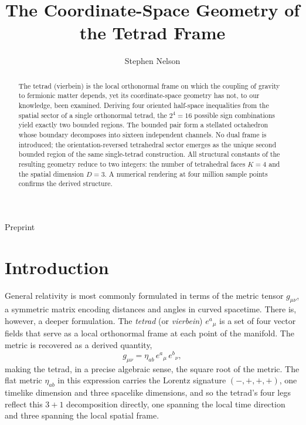 \documentclass[twocolumn]{iopjournal}
\renewcommand{\articletype}[1]{%
  {\vspace*{-8mm}\noindent \Large \sf Preprint}\par
  \vspace*{6mm}\noindent{\scriptsize \sf{\bfseries \MakeUppercase{#1}}}}
\begin{document}
\articletype{Letter}

\title{The Coordinate-Space Geometry of the Tetrad Frame}

\author{Stephen Nelson}



\begin{abstract}
The tetrad (vierbein) is the local orthonormal frame on which the coupling of gravity to fermionic matter depends, yet its coordinate-space geometry has not, to our knowledge, been examined. Deriving four oriented half-space inequalities from the spatial sector of a single orthonormal tetrad, the $2^4 = 16$ possible sign combinations yield exactly two bounded regions. The bounded pair form a stellated octahedron whose boundary decomposes into sixteen independent channels. No dual frame is introduced; the orientation-reversed tetrahedral sector emerges as the unique second bounded region of the same single-tetrad construction. All structural constants of the resulting geometry reduce to two integers: the number of tetrahedral faces $K = 4$ and the spatial dimension $D = 3$. A numerical rendering at four million sample points confirms the derived structure.
\end{abstract}


\section*{Introduction}

General relativity is most commonly formulated in terms of the metric tensor $g_{\mu\nu}$, a symmetric matrix encoding distances and angles in curved spacetime. There is, however, a deeper formulation. The \emph{tetrad} (or \emph{vierbein}) $e^a{}_\mu$ is a set of four vector fields that serve as a local orthonormal frame at each point of the manifold. The metric is recovered as a derived quantity,
\begin{equation}
g_{\mu\nu} = \eta_{ab}\, e^a{}_\mu\, e^b{}_\nu,
\end{equation}
making the tetrad, in a precise algebraic sense, the square root of the metric. The flat metric $\eta_{ab}$ in this expression carries the Lorentz signature $(-,+,+,+)$, one timelike dimension and three spacelike dimensions, and so the tetrad's four legs reflect this $3+1$ decomposition directly, one spanning the local time direction and three spanning the local spatial frame.
\end{document}
